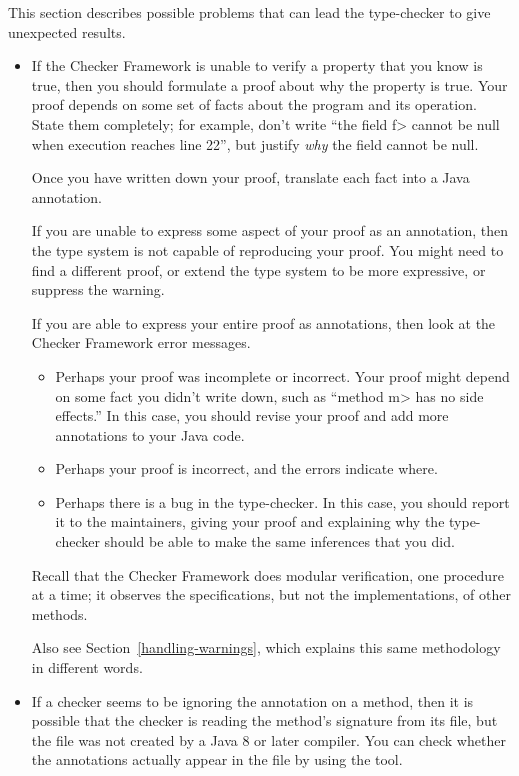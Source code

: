 
This section describes possible problems that can lead the type-checker to
give unexpected results.


\begin{itemize}
\item
  If the Checker Framework is unable to verify a property that you know is
  true, then you should formulate a proof about why the property is true.
  Your proof depends on some set of facts about the program and its
  operation.  State them completely; for example, don't write ``the field
  \<f> cannot be null when execution reaches line 22'', but justify
  \emph{why} the field cannot be null.

  Once you have written down your proof, translate each fact into a Java
  annotation.

  If you are unable to express some aspect of your proof as an annotation,
  then the type system is not capable of reproducing your proof.  You might
  need to find a different proof, or extend the type system to be more
  expressive, or suppress the warning.

  If you are able to express your entire proof as annotations, then look at
  the Checker Framework error messages.
  \begin{itemize}
  \item
    Perhaps your proof was incomplete or incorrect.  Your proof might
    depend on some fact you didn't write down, such as ``method
    \<m> has no side effects.''  In this case, you should revise your proof
    and add more annotations to your Java code.
  \item
    Perhaps your proof is incorrect, and the errors indicate where.
  \item
    Perhaps there is a bug in the type-checker.  In this case,
    you should report it to the maintainers, giving your proof and explaining
    why the type-checker should be able to make the same inferences that you did.
  \end{itemize}

  Recall that the Checker Framework does modular verification,
  one procedure at a time; it observes the specifications, but not the
  implementations, of other methods.

  Also see Section~\ref{handling-warnings}, which explains this same
  methodology in different words.

\item
If a checker seems to be ignoring the annotation on a method, then it is
possible that the checker is reading the method's signature from its
 file, but the  file was not created by a Java 8
or later compiler.
You can check whether the annotations actually appear in the
 file by using the  tool.


\end{itemize}

